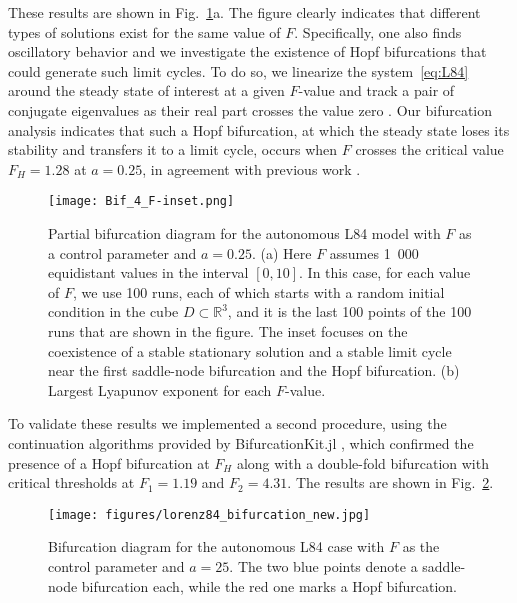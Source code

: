 \documentclass[%
 aip, cha,
 amsmath,amssymb,
 reprint,%
author-year,%
]{revtex4-1}
\newcommand{\0}{\mathbf 0}
\begin{document}
These results %
are shown in Fig.~\ref{fig:colonna}a. The figure clearly indicates that different types of solutions exist for the same value of $F$. Specifically, one also finds oscillatory behavior and we investigate the existence of Hopf bifurcations that could generate such limit cycles. To do so, we linearize the system~\eqref{eq:L84} around the steady state of interest at a given $F$-value \citep{Kuznetsov.1995, dijkstra2013nonlinear} and track a %
pair of conjugate eigenvalues as their real part crosses the value zero
 \citep{guckenheimer, Ghil.Chil.1987}. 
 Our bifurcation analysis indicates that such a Hopf bifurcation, at which the steady state loses its stability and transfers it to a limit cycle, occurs when $F$ crosses the critical value $F_H = 1.28$ at $a = 0.25$, in agreement with previous work \citep{shilnikov, vanveen2003}. \\
\begin{figure}[h]
 	\texttt{[image: Bif\_4\_F-inset.png]}
 	\caption{Partial bifurcation diagram for the autonomous L84 model with $F$ as a control parameter and $a = 0.25$. (a) Here $F$ assumes 1~000 equidistant values in the interval $[0,10].$ 
 		In this case, for each value of $F$, we use 100 runs, each of which starts with a random initial condition in the cube $D \subset \mathbb R^3$, and it is the last 100 points of the 100 runs that are shown in the figure. The inset focuses on the coexistence of a stable stationary solution and a stable limit cycle near the first saddle-node bifurcation and the Hopf bifurcation. 
 			(b) Largest Lyapunov exponent for each $F$-value.}
 	\label{fig:colonna}
 \end{figure}
To validate these results we implemented a second procedure, using the continuation algorithms provided by BifurcationKit.jl \citep{veltz:hal-02902346}, which confirmed the presence of a Hopf bifurcation at $F_H$ along with a double-fold bifurcation 
with critical thresholds at $F_1 = 1.19$ and $F_2 = 4.31$. The results are shown in Fig.~\ref{fig:bif_kit}. \\
\begin{figure}[h]
\hspace{-10pt}
    \texttt{[image: figures/lorenz84\_bifurcation\_new.jpg]}
    \caption{Bifurcation diagram for the autonomous L84 case with $F$ as the control parameter and $a=25$. The two blue points denote a saddle-node bifurcation each, while the red one marks a Hopf bifurcation.}
    \label{fig:bif_kit}
\end{figure}
\end{document}
